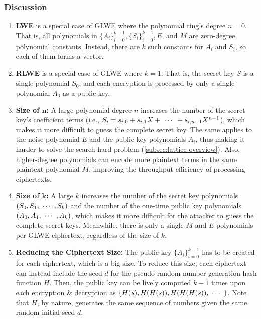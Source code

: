 \subsubsection{Discussion}
\begin{enumerate}
\item \textbf{LWE} is a special case of GLWE where the polynomial ring's degree $n = 0$. That is, all polynomials in $\{A_i\}_{i=0}^{k-1}, \{S_i\}_{i=0}^{k-1}, E$, and $M$ are zero-degree polynomial constants. Instead, there are $k$ such constants for $A_i$ and $S_i$, so each of them forms a vector.
\item \textbf{RLWE} is a special case of GLWE where $k = 1$. That is, the secret key $S$ is a single polynomial $S_0$, and each encryption is processed by only a single polynomial $A_0$ as a public key.
\item \textbf{Size of $\bm{n}$:} A large polynomial degree $n$ increases the number of the secret key's coefficient terms (i.e., $S_i = s_{i,0} + s_{i,1}X + \text{ } \text{$\cdots$} \text{ } + s_{i, n-1}X^{n-1} $), which makes it more difficult to guess the complete secret key. The same applies to the noise polynomial $E$ and the public key polynomials $A_i$, thus making it harder to solve the search-hard problem (\autoref{subsec:lattice-overview}). Also, higher-degree polynomials can encode more plaintext terms in the same plaintext polynomial $M$, improving the throughput efficiency of processing ciphertexts.
\item \textbf{Size of $\bm{k}$:} A large $k$ increases the number of the secret key polynomials $(S_0, S_1, \text{ } \text{$\cdots$} \text{ }, S_k)$ and the number of the one-time public key polynomials $(A_0, A_1, \text{ } \text{$\cdots$} \text{ }, A_k)$, which makes it more difficult for the attacker to guess the complete secret keys. Meanwhile, there is only a single $M$ and $E$ polynomials per GLWE ciphertext, regardless of the size of $k$. 
\item \textbf{Reducing the Ciphertext Size:} The public key $\{A_i\}_{i=0}^{k-1}$ has to be created for each ciphertext, which is a big size. To reduce this size, each ciphertext can instead include the seed $d$ for the pseudo-random number generation hash function $H$. Then, the public key can be lively computed $k-1$ times upon each encryption \& decryption as $\{H(s), H(H(s)), H(H(H(s)), \text{ } \text{$\cdots$} \text{ } \}$. Note that $H$, by nature, generates the same sequence of numbers given the same random initial seed $d$. 
\end{enumerate}

